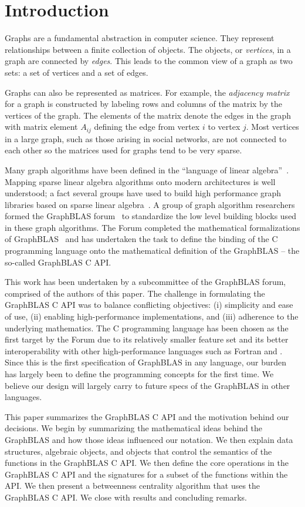 \section{Introduction}
\label{sec:intro}

Graphs are a fundamental abstraction in computer science.  They represent
relationships between a finite collection of objects.   The objects, or
\emph{vertices}, in a graph are connected by \emph{edges}.  This leads
to the common view of a graph as two sets: a set of vertices and a set
of edges.

Graphs can also be represented as matrices.   For example, the
\emph{adjacency matrix} for a graph is constructed by labeling rows and
columns of the matrix by the vertices of the graph.  The elements of
the matrix denote the edges in the graph with matrix element $A_{ij}$
defining the edge from vertex $i$ to vertex $j$.  Most
vertices in a large graph, such as those arising in social networks,
are not connected to each other so the matrices used for graphs tend to
be very sparse.

Many graph algorithms have been defined in the ``language of linear
algebra''~\cite{kepner2011graph}.  Mapping sparse linear algebra algorithms 
onto modern architectures is well understood; a fact several 
groups have used to build high
performance graph libraries based on sparse linear algebra~\cite{combblas,
gadepally2015graphulo, gpi2016, sundaram2015graphmat,che2016programming}.  A group
of graph algorithm researchers formed the GraphBLAS
forum~\cite{graphblas_web} to standardize the low level building
blocks used in these graph algorithms.  The Forum completed the
mathematical formalizations of GraphBLAS~\cite{mathgraphblas16} and
has undertaken the task to define the
binding of the C programming language onto the mathematical definition of
the GraphBLAS -- the so-called GraphBLAS C API.  
 

This work has been undertaken by a subcommittee of the GraphBLAS forum, comprised of
the authors of this paper.  The challenge in formulating
the GraphBLAS C API was to balance conflicting 
objectives: (i) simplicity and ease of use,
(ii) enabling high-performance implementations, and (iii) adherence to
the underlying mathematics. 
The C programming language has been chosen as the first target by the Forum due
to its relatively smaller feature set and its better interoperability with other high-performance 
languages such as Fortran and \Cpp.
Since this is the first specification of GraphBLAS in any language, our burden 
has largely been to define the programming concepts for the first time. We believe
our design will largely carry to future specs of the GraphBLAS in other 
languages. 

This paper summarizes the GraphBLAS C API and the
motivation behind our decisions. 
We begin by summarizing the 
mathematical ideas behind the GraphBLAS and how those ideas
influenced our notation.  We then explain data structures,
algebraic objects, and objects that control the semantics of the functions
in the GraphBLAS C API.  We then define the
core operations in the GraphBLAS C  API and the signatures
for a subset of the functions  within the API.  We then present a betweenness centrality 
algorithm that uses the GraphBLAS C  API. We close with results
and concluding remarks.
